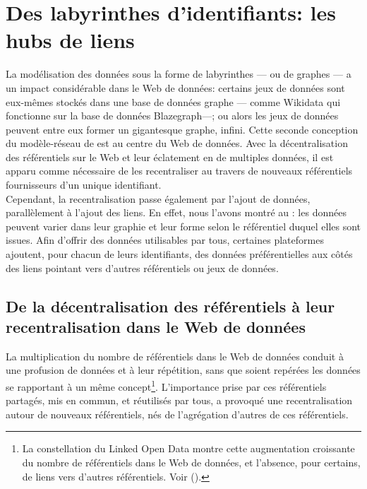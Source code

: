 \section{\label{III-A-2}Des labyrinthes d'identifiants: les hubs de liens}

La modélisation des données sous la forme de labyrinthes --- ou de graphes --- a un impact  considérable dans le Web de données: certains jeux de données sont eux-mêmes stockés dans une base de données graphe --- comme Wikidata qui fonctionne sur la base de données Blazegraph---; ou alors les jeux de données peuvent entre eux former un gigantesque graphe, infini. Cette seconde conception du modèle-réseau de  est au centre du Web de données. Avec la décentralisation des référentiels sur le Web et leur éclatement en de multiples données, il est apparu comme nécessaire de les recentraliser au travers de nouveaux référentiels fournisseurs d'un unique identifiant.\\

Cependant, la recentralisation passe également par l'ajout de données, parallèlement à l'ajout des liens. En effet, nous l'avons montré au : les données peuvent varier dans leur graphie et leur forme selon le référentiel duquel elles sont issues. Afin d'offrir des données utilisables par tous, certaines plateformes ajoutent, pour chacun de leurs identifiants, des données préférentielles aux côtés des liens pointant vers d'autres référentiels ou jeux de données.

\subsection{\label{III-A-2-a}De la décentralisation des référentiels à leur recentralisation dans le Web de données}

La multiplication du nombre de référentiels dans le Web de données conduit à une profusion de données et à leur répétition, sans que soient repérées les données se rapportant à un même concept\footnote{La constellation du Linked Open Data montre cette augmentation croissante du nombre de référentiels dans le Web de données, et l'absence, pour certains, de liens vers d'autres référentiels. Voir  ().}. L'importance prise par ces référentiels partagés, mis en commun, et réutilisés par tous, a provoqué une recentralisation autour de nouveaux référentiels, nés de l'agrégation d'autres de ces référentiels.\\

